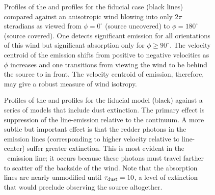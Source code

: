\documentclass[12pt,preprint]{aastex}
\begin{document}
\begin{figure}
\caption{
Profiles of the  and  profiles for the fiducial
case (black lines) compared against an anisotropic wind blowing into
only $2\pi$ steradians as viewed from $\phi = 0^\circ$ (source
uncovered) to $\phi = 180^\circ$ (source covered).  One detects
significant emission for all orientations of this wind but significant
absorption only for $\phi \ge 90^\circ$.
The velocity centroid of the 
emission shifts from positive to negative velocities as $\phi$
increases and one transitions from viewing the wind to be behind the
source to in front.  The velocity centroid of emission, therefore, may
give a robust measure of wind isotropy.
}
\label{fig:anisotropic}
\end{figure}

\begin{figure}
\caption{
Profiles of the  and  profiles for the fiducial
model (black) against a series of models that include 
dust extinction.  The primary effect is suppression of
the line-emission relative to the continuum. 
A more subtle but important effect is that the redder photons in the
emission lines (corresponding to higher velocity relative to
line-center) suffer greater extinction.  This is most evident in the
\feiic\ emission line; it occurs because these photons must
travel farther to scatter off the backside of the wind.  Note that
the absorption lines are nearly unmodified until $\tau_{\rm dust} = 10$, a
level of extinction that would preclude observing the source
altogether.
}
\label{fig:dust}
\end{figure}

\end{document}
